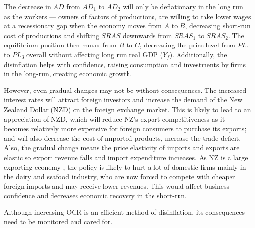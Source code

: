 \documentclass[a4paper,12pt]{article}
\begin{document}
The decrease in $AD$ from $AD_1$ to $AD_2$ will only be deflationary in the long run as the workers --- owners of factors of productions, are willing to take lower wages at a recessionary gap when the economy moves from $A$ to $B$, decreasing short-run cost of productions and shifting $SRAS$ downwards from $SRAS_1$ to $SRAS_2$. The equilibrium position then moves from $B$ to $C$, decreasing the price level from $PL_1$ to $PL_3$ overall without affecting long run real GDP ($Y_f$). Additionally, the disinflation helps with confidence, raising consumption and investments by firms in the long-run, creating economic growth.

However, even gradual changes may not be without consequences. The increased interest rates will attract foreign investors and increase the demand of the New Zealand Dollar (NZD) on the foreign exchange market. This is likely to lead to an appreciation of NZD, which will reduce NZ's export competitiveness as it becomes relatively more expensive for foreign consumers to purchase its exports; and will also decrease the cost of imported products, increase the trade deficit. Also, the gradual change means the price elasticity of imports and exports are elastic so export revenue falls and import expenditure increases. As NZ is a large exporting economy \parencite{exports}, the policy is likely to hurt a lot of domestic firms mainly in the dairy and seafood industry, who are now forced to compete with cheaper foreign imports and may receive lower revenues. This would affect business confidence and decreases economic recovery in the short-run.

Although increasing OCR is an efficient method of disinflation, its consequences need to be monitored and cared for.




\newpage
\printbibliography
\end{document}
